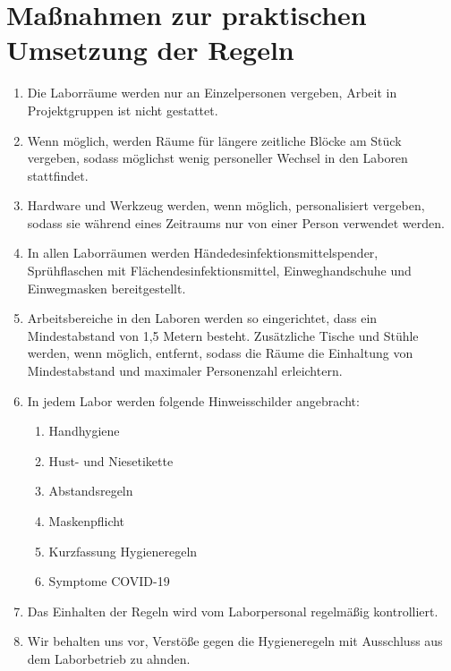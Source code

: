 \section{Maßnahmen zur praktischen Umsetzung der Regeln}\label{sec:umsetzung}

\begin{enumerate}
    \item Die Laborräume werden nur an Einzelpersonen vergeben, Arbeit in Projektgruppen ist nicht gestattet.
    \item Wenn möglich, werden Räume für längere zeitliche Blöcke am Stück vergeben, sodass möglichst wenig personeller Wechsel in den Laboren stattfindet.
    \item Hardware und Werkzeug werden, wenn möglich, personalisiert vergeben, sodass sie während eines Zeitraums nur von einer Person verwendet werden.
    \item In allen Laborräumen werden Händedesinfektionsmittelspender, Sprühflaschen mit Flächendesinfektionsmittel, Einweghandschuhe und Einwegmasken bereitgestellt. 
    \item Arbeitsbereiche in den Laboren werden so eingerichtet, dass ein Mindestabstand von 1,5 Metern besteht. Zusätzliche Tische und Stühle werden, wenn möglich, entfernt, sodass die Räume die Einhaltung von  Mindestabstand und maximaler Personenzahl erleichtern.
    \item In jedem Labor werden folgende Hinweisschilder angebracht:
    \begin{enumerate}
        \item Handhygiene
        \item Hust- und Niesetikette
        \item Abstandsregeln
        \item Maskenpflicht
        \item Kurzfassung Hygieneregeln
        \item Symptome COVID-19
    \end{enumerate}
    \item Das Einhalten der Regeln wird vom Laborpersonal regelmäßig kontrolliert.
    \item Wir behalten uns vor, Verstöße gegen die Hygieneregeln mit Ausschluss aus dem Laborbetrieb zu ahnden.
\end{enumerate}

